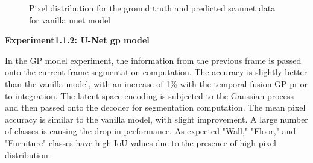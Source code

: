 	\begin{figure}%
		\centering
		\qquad
		\caption{Pixel distribution for the ground truth and predicted scannet data for vanilla unet model}%
		\label{fig:y_gt_pred_vanilla}%
	\end{figure}
    { \bf Experiment1.1.2: U-Net gp model}
    
    In the GP model experiment, the information from the previous frame is passed onto the current frame segmentation computation. The accuracy is slightly better than the vanilla model, with an increase of 1\% with the temporal fusion GP prior to integration. The latent space encoding is subjected to the Gaussian process and then passed onto the decoder for segmentation computation. The mean pixel accuracy is similar to the vanilla model, with slight improvement. A large number of classes is causing the drop in performance. As expected "Wall," "Floor," and "Furniture" classes have high IoU values due to the presence of high pixel distribution. 
    
